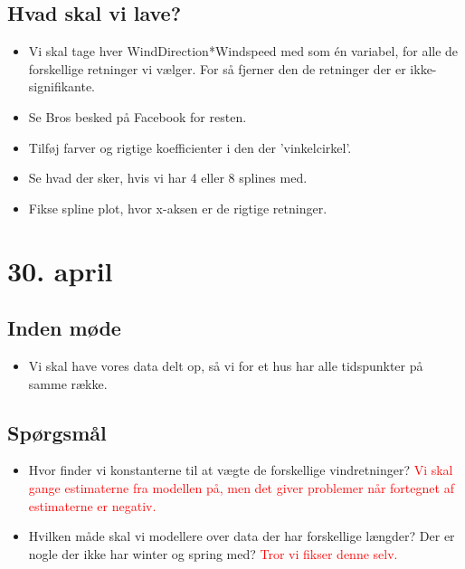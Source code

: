 \subsection{Hvad skal vi lave?}
\begin{itemize}
    \item Vi skal tage hver WindDirection*Windspeed med som én variabel, for alle de forskellige retninger vi vælger. For så fjerner den de retninger der er ikke-signifikante.
    \item Se Bros besked på Facebook for resten. 
    \item Tilføj farver og rigtige koefficienter i den der 'vinkelcirkel'. 
    \item Se hvad der sker, hvis vi har 4 eller 8 splines med. 
    \item Fikse spline plot, hvor x-aksen er de rigtige retninger. 
\end{itemize}

\pagebreak

\section{30. april}

\subsection{Inden møde}
\begin{itemize}
    \item Vi skal have vores data delt op, så vi for et hus har alle tidspunkter på samme række.
\end{itemize}

\subsection{Spørgsmål}
\begin{itemize}
    \item Hvor finder vi konstanterne til at vægte de forskellige vindretninger? \textcolor{red}{Vi skal gange estimaterne fra modellen på, men det giver problemer når fortegnet af estimaterne er negativ. }
    \item Hvilken måde skal vi modellere over data der har forskellige længder? Der er nogle der ikke har winter og spring med? \textcolor{red}{Tror vi fikser denne selv.}
\end{itemize}

